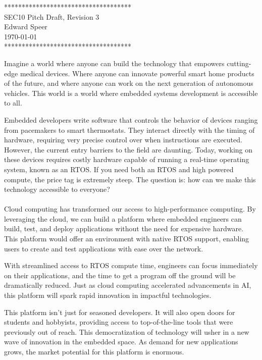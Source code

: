 \documentclass{article}
\newcommand{\HWNUM}{3}
\begin{document}

    \begin{center}
        ************************************ \\
        SEC10 Pitch Draft, Revision \HWNUM \\
        Edward Speer \\
        \today \\
        ************************************
    \end{center}

Imagine a world where anyone can build the technology that empowers cutting-edge
medical devices. Where anyone can innovate powerful smart home products of the
future, and where anyone can work on the next generation of autonomous vehicles.
This world is a world where embedded systems development is accessible to all.

Embedded developers write software that controls the behavior of devices 
ranging from pacemakers to smart thermostats. They interact directly with 
the timing of hardware, requiring very precise control over when instructions
are executed. However, the current entry barriers to the field are
daunting. Today, working on these devices requires costly hardware capable
of running a real-time operating system, known as an RTOS. If you need both an
RTOS and high powered compute, the price tag is extremely steep. The question
is: how can we make this technology accessible to everyone? \\ \hfill \\

Cloud computing has transformed our access to high-performance computing. By
leveraging the cloud, we can build a platform where embedded engineers can
build, test, and deploy applications without the need for expensive hardware.
This platform would offer an environment with native RTOS support, enabling
users to create and test applications with ease over the network.

With streamlined access to RTOS compute time, engineers can focus immediately
on their applications, and the time to get a program off the ground will be 
dramatically reduced. Just as cloud computing accelerated advancements in AI,
this platform will spark rapid innovation in impactful technologies.

This platform isn't just for seasoned developers. It will also open doors for
students and hobbyists, providing access to top-of-the-line tools that were
previously out of reach. This democratization of technology will usher in a
new wave of innovation in the embedded space. As demand for new
applications grows, the market potential for this platform is enormous.
\end{document}
